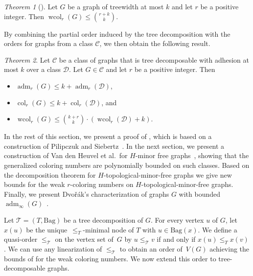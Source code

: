 \documentclass[1p,number,a4paper]{elsarticle}
\theoremstyle{remark}
\newcommand{\Cc}{\mathscr{C}}
\newcommand{\Dd}{\mathscr{D}}
\newcommand{\Tt}{\mathcal{T}}
\newcommand{\bag}{\mathrm{Bag}}
\DeclareMathOperator{\col}{col}
\DeclareMathOperator{\wcol}{wcol}
\DeclareMathOperator{\adm}{adm}
\newtheorem{theorem}{Theorem}[section]
\begin{document}
\begin{theorem}[\cite{grohe2015colouring}]\label{thm:wcol-tw}
  Let $G$ be a graph of treewidth at most $k$ and 
  let $r$ be a positive integer. Then 
  $\wcol_r(G)\leq \binom{r+k}{k}$. 
\end{theorem}


By combining the partial order induced by the tree decomposition with the orders for graphs from a class $\Cc$, we then obtain the following result. 

\begin{theorem}\label{thm:decomposable-wcol}
  Let $\Cc$ be a class of graphs that is tree decomposable 
  with adhesion at most $k$ over a class $\Dd$. Let $G\in\Cc$
  and let $r$ be a positive integer. Then 
  \begin{itemize}
  \item $\adm_r(G)\leq k+\adm_r(\Dd)$, 
  \item $\col_r(G)\leq k+\col_r(\Dd)$, and
  \item $\wcol_r(G)\leq \binom{k+r}{k}\cdot (\wcol_r(\Dd)+k)$. 
  \end{itemize}
  \end{theorem}

In the rest of this section, we present a proof of , which is based on a construction of Pilipczuk and Siebertz~\cite{pilipczuk2019polynomial}. 
In the next section, we present a construction of Van den Heuvel et al.\ for $H$-minor free graphs~\cite{van2017generalised}, showing that the generalized coloring numbers are polynomially bounded on such classes. 
Based on the decomposition theorem for $H$-topological-minor-free 
graphs we give new bounds for the weak $r$-coloring numbers on 
$H$-topological-minor-free graphs. 
Finally, we present Dvo\v{r}\'ak's characterization of graphs $G$ 
with bounded $\adm_\infty(G)$~\cite{dvorak2012stronger}. 

\bigskip
Let $\Tt=(T,\bag)$ be a tree decomposition of $G$. 
For every vertex $u$ of $G$, let $x(u)$ be the unique~$\leq_T$-minimal node of $T$ with $u\in \bag(x)$. 
We define a quasi-order $\leq_{\Tt}$ on the vertex set of~$G$ by $u\leq_{\Tt} v$ if and only if $x(u)\leq_T x(v)$. 
We can use any linearization of $\leq_\Tt$ to obtain an order of~$V(G)$ achieving the bounds of  for the weak coloring numbers. 
We now extend this order to tree-decomposable graphs. 
\end{document}
